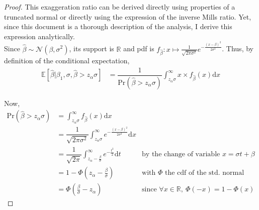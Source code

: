 \documentclass[a4paper, 11pt]{report}
\begin{document}
		\begin{proof}
			
			This exaggeration ratio can be derived directly using properties of a truncated normal or directly using the expression of the inverse Mills ratio. Yet, since this document is a thorough description of the analysis, I derive this expression analytically.\\
			
			Since $\hat{\beta} \sim \mathcal{N}(\beta, \sigma^{2})$, its support is $\mathbb{R}$ and pdf is $f_{\hat{\beta}}: x \mapsto \frac{1}{\sqrt{2 \pi \sigma^{2}}} e^{-\frac{(x -\beta)^{2}}{2\sigma^{2}}}$. Thus, by definition of the conditional expectation,
			~
			\begin{align*}
				\mathbb{E}\left[ \hat{\beta} | \beta_{1}, \sigma, \hat{\beta} > z_{\alpha} \sigma \right]  
					& =  \dfrac{1}{\text{Pr}(\hat{\beta} > z_{\alpha}\sigma)} \int_{z_{\alpha}\sigma}^{\infty}x \times f_{\hat{\beta}} (x)\text{d}x
			\end{align*}
			
			Now,
			~
			\begin{align*}
				\text{Pr}(\hat{\beta} > z_{\alpha}\sigma) 
					& = \int_{z_{\alpha}\sigma}^{\infty} f_{\hat{\beta}} (x) \text{d}x\\
					& =  \dfrac{1}{\sqrt{2\pi \sigma^{2}}}\int_{z_{\alpha}\sigma}^{\infty} e^{-\frac{(x -\beta)^{2}}{2\sigma^{2}}} \text{d}x\\
					& =  \dfrac{1}{\sqrt{2\pi }}\int_{z_{\alpha} - \frac{\beta}{\sigma}}^{\infty} e^{-\frac{t^{2}}{2}} \text{d}t & \text{by the change of variable } x = \sigma t + \beta\\
					& =  1 - \Phi\left( z_{\alpha} - \frac{\beta}{\sigma} \right) & \text{with $\Phi$ the cdf of the std. normal} \\
					& = \Phi\left( \frac{\beta}{\sigma} - z_{\alpha} \right) & \text{since } \forall x \in  \mathbb{R}, \ \Phi(-x) = 1 - \Phi(x)
			\end{align*}
			

\end{proof}
\end{document}

